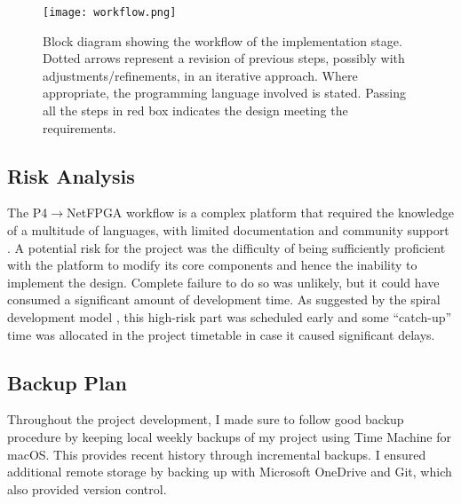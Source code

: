 	\begin{figure}[!ht]
		\centering
		\texttt{[image: workflow.png]}
		\caption{Block diagram showing the workflow of the implementation stage. Dotted arrows represent a revision of previous steps, possibly with adjustments/refinements, in an iterative approach. Where appropriate, the programming language involved is stated. Passing all the steps in red box indicates the design meeting the requirements.}
		\label{fig:workflow}
	\end{figure}
	
	\subsection{Risk Analysis}
	The P4$\rightarrow$NetFPGA workflow is a complex platform that required the knowledge of a multitude of languages, with limited documentation \cite{fpga} and community support \cite{support}. A potential risk for the project was the difficulty of being sufficiently proficient with the platform to modify its core components and hence the inability to implement the design. Complete failure to do so was unlikely, but it could have consumed a significant amount of development time. As suggested by the spiral development model \cite{spiral}, this high-risk part was scheduled early and some “catch-up” time was allocated in the project timetable in case it caused significant delays.
	
	\subsection{Backup Plan}	
	Throughout the project development, I made sure to follow good backup procedure by keeping local weekly backups of my project using Time Machine for macOS. This provides recent history through incremental backups. I ensured additional remote storage by backing up with Microsoft OneDrive and Git, which also provided version control.